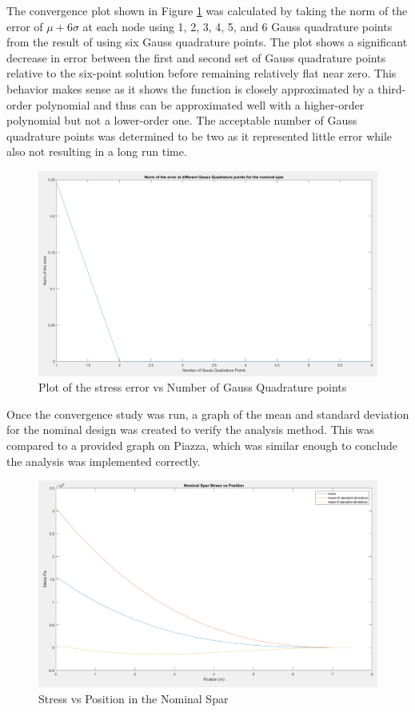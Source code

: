 \documentclass[11pt]{article}%
\begin{document}
The convergence plot shown in Figure \ref{fig:conv} was calculated by taking the norm of the error of $\mu+6\sigma$ at each node using 1, 2, 3, 4, 5, and 6 Gauss quadrature points from the result of using six Gauss quadrature points. The plot shows a significant decrease in error between the first and second set of Gauss quadrature points relative to the six-point solution before remaining relatively flat near zero. This behavior makes sense as it shows the function is closely approximated by a third-order polynomial and thus can be approximated well with a higher-order polynomial but not a lower-order one. The acceptable number of Gauss quadrature points was determined to be two as it represented little error while also not resulting in a long run time.
\begin{figure}[h!]
    \centering
    \includegraphics[width=0.75\linewidth]{conv.png}
    \caption{ Plot of the stress error vs Number of Gauss Quadrature points }
    \label{fig:conv}
\end{figure}

Once the convergence study was run, a graph of the mean and standard deviation for the nominal design was created to verify the analysis method. This was compared to a provided graph on Piazza, which was similar enough to conclude the analysis was implemented correctly.

\begin{figure}[h!]
    \centering
   \includegraphics[width=0.75\linewidth]{nomstress.png}
    \caption{Stress vs Position in the Nominal Spar }
    \label{fig:nomstress}
\end{figure}
\newpage
\end{document}
